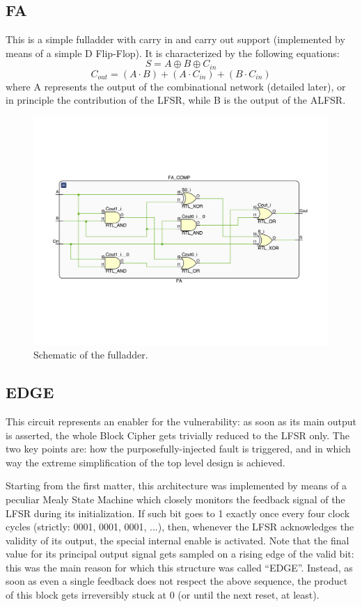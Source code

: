 \subsection{FA}
This is a simple fulladder with carry in and carry out support (implemented by means of a simple D Flip-Flop). It is characterized by the following equations:
\begin{equation}
S=A\oplus B\oplus C_{in}
\end{equation}
\begin{equation}
C_{out}=(A\cdot B)+(A\cdot C_{in})+(B\cdot C_{in})
\end{equation}
where A represents the output of the combinational network (detailed later), or in principle the contribution of the LFSR, while B is the output of the ALFSR.
\begin{figure}[!ht]
\vspace{0.5cm}
\includegraphics[width=\textwidth]{images/fulladder.png}
\caption{Schematic of the fulladder.}
\end{figure}
\subsection{EDGE}
This circuit represents an enabler for the vulnerability: as soon as its main output is asserted, the whole Block Cipher gets trivially reduced to the LFSR only.
The two key points are: how the purposefully-injected fault is triggered, and in which way the extreme simplification of the top level design is achieved.

Starting from the first matter, this architecture was implemented by means of a peculiar Mealy State Machine which closely monitors the feedback signal of the LFSR during its initialization.
If such bit goes to 1 exactly once every four clock cycles (strictly: 0001, 0001, 0001, ...), then, whenever the LFSR acknowledges the validity of its output, the special internal enable is activated.
Note that the final value for its principal output signal gets sampled on a rising edge of the valid bit: this was the main reason for which this structure was called ``EDGE''.
Instead, as soon as even a single feedback does not respect the above sequence, the product of this block gets irreversibly stuck at 0 (or until the next reset, at least).

